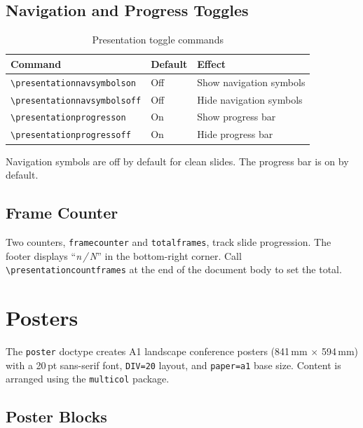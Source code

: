 \subsection{Navigation and Progress Toggles}

\begin{table}[htbp]
    \centering
    \caption{Presentation toggle commands}
    \label{tab:presentation-toggles}
    \begin{tabular}{@{} l l p{5cm} @{}}
        \toprule
        \textbf{Command} & \textbf{Default} & \textbf{Effect} \\
        \midrule
        \texttt{\textbackslash presentationnavsymbolson}  & Off & Show navigation symbols \\
        \texttt{\textbackslash presentationnavsymbolsoff} & Off & Hide navigation symbols \\
        \texttt{\textbackslash presentationprogresson}    & On  & Show progress bar \\
        \texttt{\textbackslash presentationprogressoff}   & On  & Hide progress bar \\
        \bottomrule
    \end{tabular}
\end{table}

Navigation symbols are off by default for clean slides.  The progress bar
is on by default.

\subsection{Frame Counter}

Two counters, \texttt{framecounter} and \texttt{totalframes}, track slide
progression.  The footer displays ``\textit{n\,/\,N}'' in the bottom-right
corner.  Call \texttt{\textbackslash presentationcountframes} at the end
of the document body to set the total.

\section{Posters}
\label{sec:poster}

The \texttt{poster} doctype creates A1 landscape conference posters
(841\,mm $\times$ 594\,mm) with a 20\,pt sans-serif font, \texttt{DIV=20}
layout, and \texttt{paper=a1} base size.  Content is arranged using the
\texttt{multicol} package.

\subsection{Poster Blocks}

